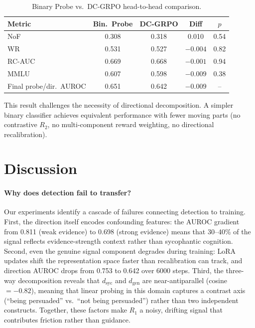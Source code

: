 \documentclass[11pt,a4paper]{article}
\begin{document}
\begin{table}[h]
\centering
\caption{Binary Probe vs.\ DC-GRPO head-to-head comparison.}
\label{tab:probe_head}
\small
\begin{tabular}{lcccc}
\toprule
Metric & Bin.\ Probe & DC-GRPO & Diff & $p$ \\
\midrule
NoF               & 0.308 & 0.318 & 0.010  & 0.54 \\
WR                & 0.531 & 0.527 & $-0.004$ & 0.82 \\
RC-AUC            & 0.669 & 0.668 & $-0.001$ & 0.94 \\
MMLU              & 0.607 & 0.598 & $-0.009$ & 0.38 \\
Final probe/dir.\ AUROC & 0.651 & 0.642 & $-0.009$ & -- \\
\bottomrule
\end{tabular}
\end{table}

This result challenges the necessity of directional decomposition. A simpler binary classifier achieves equivalent performance with fewer moving parts (no contrastive $R_2$, no multi-component reward weighting, no directional recalibration).

\section{Discussion}

\paragraph{Why does detection fail to transfer?}
Our experiments identify a cascade of failures connecting detection to training. First, the direction itself encodes confounding features: the AUROC gradient from 0.811 (weak evidence) to 0.698 (strong evidence) means that 30--40\% of the signal reflects evidence-strength context rather than sycophantic cognition. Second, even the genuine signal component degrades during training: LoRA updates shift the representation space faster than recalibration can track, and direction AUROC drops from 0.753 to 0.642 over 6000 steps. Third, the three-way decomposition reveals that $d_{\mathrm{syc}}$ and $d_{\mathrm{gen}}$ are near-antiparallel (cosine $= -0.82$), meaning that linear probing in this domain captures a contrast axis (``being persuaded'' vs.\ ``not being persuaded'') rather than two independent constructs. Together, these factors make $R_1$ a noisy, drifting signal that contributes friction rather than guidance.
\end{document}
